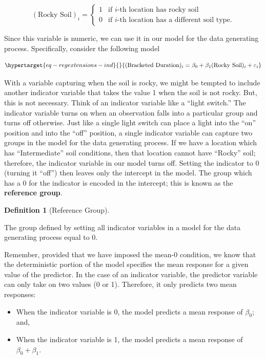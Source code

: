 \documentclass[
  letterpaper,
  DIV=11,
  numbers=noendperiod]{scrreprt}
\providecommand{\tightlist}{%
  \setlength{\itemsep}{0pt}\setlength{\parskip}{0pt}}\usepackage{longtable,booktabs,array}
\theoremstyle{definition}
\newtheorem{definition}{Definition}[chapter]
\theoremstyle{definition}
\theoremstyle{plain}
\theoremstyle{remark}
\begin{document}
\[
(\text{Rocky Soil})_i = \begin{cases} 1 & \text{if } i\text{-th location has rocky soil} \\
0 & \text{if } i\text{-th location has a different soil type}. \end{cases}
\]

Since this variable is numeric, we can use it in our model for the data
generating process. Specifically, consider the following model

\begin{equation}\protect\hypertarget{eq-regextensions-ind}{}{(\text{Bracketed Duration})_i = \beta_0 + \beta_1 (\text{Rocky Soil})_i + \varepsilon_i}\label{eq-regextensions-ind}\end{equation}

With a variable capturing when the soil is rocky, we might be tempted to
include another indicator variable that takes the value 1 when the soil
is not rocky. But, this is not necessary. Think of an indicator variable
like a ``light switch.'' The indicator variable turns on when an
observation falls into a particular group and turns off otherwise. Just
like a single light switch can place a light into the ``on'' position
and into the ``off'' position, a single indicator variable can capture
two groups in the model for the data generating process. If we have a
location which has ``Intermediate'' soil conditions, then that location
cannot have ``Rocky'' soil; therefore, the indicator variable in our
model turns off. Setting the indicator to 0 (turning it ``off'') then
leaves only the intercept in the model. The group which has a 0 for the
indicator is encoded in the intercept; this is known as the
\textbf{reference group}.

\begin{definition}[Reference
Group]\protect\hypertarget{def-reference-group}{}\label{def-reference-group}

The group defined by setting all indicator variables in a model for the
data generating process equal to 0.

\end{definition}

Remember, provided that we have imposed the mean-0 condition, we know
that the deterministic portion of the model specifies the mean response
for a given value of the predictor. In the case of an indicator
variable, the predictor variable can only take on two values (0 or 1).
Therefore, it only predicts two mean responses:

\begin{itemize}
\tightlist
\item
  When the indicator variable is 0, the model predicts a mean response
  of \(\beta_0\); and,
\item
  When the indicator variable is 1, the model predicts a mean response
  of \(\beta_0 + \beta_1\).
\end{itemize}
\end{document}

